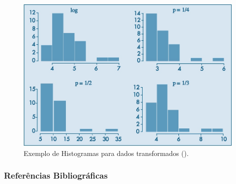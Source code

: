 \documentclass[14pt,aspectratio=1610]{beamer}
\begin{document}
\begin{frame}{}
\frametitle{}
\begin{figure}[H]
    \centering
    \includegraphics[height=0.4\textwidth,width=15cm]{Fig11}
    \caption{Exemplo de Histogramas para dados transformados (\cite{Morettin09}).}
    \label{Fig101_ex}
  \end{figure}
\end{frame}

\begin{frame}{}
\frametitle{Referências Bibliográficas}

\end{frame}
\end{document}
